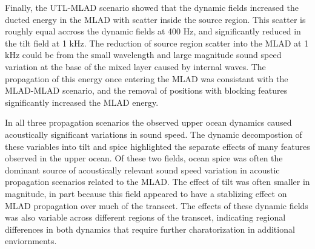 \documentclass[preprint,NumberedRefs]{JASA}
\begin{document}
Finally, the UTL-MLAD scenario showed that the dynamic fields increased the ducted energy in the MLAD with scatter inside the source region. This scatter is roughly equal accross the dynamic fields at 400 Hz, and significantly reduced in the tilt field at 1 kHz. The reduction of source region scatter into the MLAD at 1 kHz could be from the small wavelength and large magnitude sound speed variation at the base of the mixed layer caused by internal waves. The propagation of this energy once entering the MLAD was consistant with the MLAD-MLAD scenario, and the removal of positions with blocking features significantly increased the MLAD energy.

In all three propagation scenarios the observed upper ocean dynamics caused acoustically significant variations in sound speed. The dynamic decompostion of these variables into tilt and spice highlighted the separate effects of many features observed in the upper ocean. Of these two fields, ocean spice was often the dominant source of acoustically relevant sound speed variation in acoustic propagation scenarios related to the MLAD. The effect of tilt was often smaller in magnitude, in part because this field appeared to have a stablizing effect on MLAD propagation over much of the transcet. The effects of these dynamic fields was also variable across different regions of the transcet, indicating regional differences in both dynamics that require further charatorization in additional enviornments.




\end{document}
